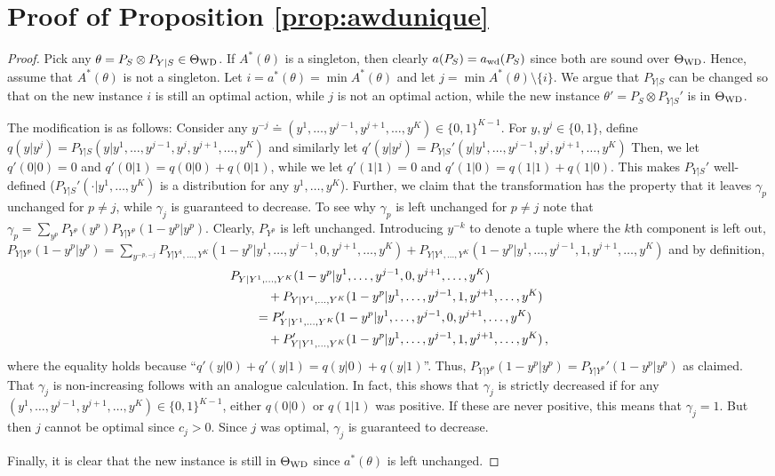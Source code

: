 \section*{Proof of Proposition \ref{prop:awdunique}}
\begin{proof}
	Pick any $\theta = P_S\otimes P_{Y|S}\in \Theta_{\mathrm{WD}}$. If $A^*(\theta)$ is a singleton, then clearly $a(P_S) = a_{\mathrm{wd}}(P_S)$ since both are sound over $\Theta_{\mathrm{WD}}$.
	Hence, assume that $A^*(\theta)$ is not a singleton.
	Let $i = a^*(\theta) = \min A^*(\theta)$ and let $j = \min A^*(\theta) \setminus \{ i \}$.
	We argue that $P_{Y|S}$ can be changed so that on the new instance $i$ is still an optimal action, while
	$j$ is not an optimal action, while the new instance $\theta' = P_S \otimes P_{Y|S}'$ is in $\Theta_{\mathrm{WD}}$.
	
	The modification is as follows:
	Consider any $y^{-j} \doteq (y^1,\dots,y^{j-1},y^{j+1},\dots,y^K)\in \{0,1\}^{K-1}$.
	For $y,y^j\in \{0,1\}$, define 
	$q(y|y^j) = P_{Y|S}(y|y^1, \dots, y^{j-1}, y^j, y^{j+1},\dots, y^K)$
	and similarly let
	$q'(y|y^j) = P_{Y|S}'(y|y^1, \dots, y^{j-1}, y^j, y^{j+1},\dots, y^K)$
	Then, we let $q'(0|0) = 0$ and $q'(0|1) = q(0|0) + q(0|1)$,
	while we let  $q'(1|1) = 0$ and $q'(1|0) = q(1|1) + q(1|0)$.
	This makes $P_{Y|S}'$ well-defined ($P_{Y|S}'(\cdot|y^1,\dots,y^K)$ is a distribution for any $y^1,\dots,y^K$).
	Further, we claim that the transformation has the property that 
	it leaves $\gamma_p$ unchanged for $p\ne j$, while $\gamma_j$ is guaranteed to decrease.
	To see why $\gamma_p$ is left unchanged for $p\ne j$ note that
	$\gamma_p = \sum_{y^p}  P_{Y^p}(y^p) P_{Y|Y^p}(1-y^p|y^p)$.
	Clearly, $P_{Y^p}$ is left unchanged.
	Introducing $y^{-k}$ to denote a tuple where the $k$th component is left out,
	$P_{Y|Y^p}(1-y^p|y^p) = \sum_{y^{-p,-j}} P_{Y|Y^1,\dots,Y^K}( 1-y^p | y^1,\dots, y^{j-1}, 0, y^{j+1}, \dots, y^K )
	+P_{Y|Y^1,\dots,Y^K}( 1-y^p | y^1,\dots, y^{j-1}, 1, y^{j+1}, \dots, y^K )$
	and by definition,
	\begin{align*}
	\MoveEqLeft P_{Y|Y^1,\dots,Y^K}( 1-y^p | y^1,\dots, y^{j-1}, 0, y^{j+1}, \dots, y^K )\\
	&\quad +P_{Y|Y^1,\dots,Y^K}( 1-y^p | y^1,\dots, y^{j-1}, 1, y^{j+1}, \dots, y^K )\\
	&
	=
	P_{Y|Y^1,\dots,Y^K}'( 1-y^p | y^1,\dots, y^{j-1}, 0, y^{j+1}, \dots, y^K )\\
	&\quad+P_{Y|Y^1,\dots,Y^K}'( 1-y^p | y^1,\dots, y^{j-1}, 1, y^{j+1}, \dots, y^K )\,,
	\end{align*}
	where the equality holds because ``$q'(y|0)+q'(y|1) = q(y|0) + q(y|1)$''.
	Thus, $P_{Y|Y^p}(1-y^p|y^p) = P_{Y|Y^p}'(1-y^p|y^p)$ as claimed.
	That $\gamma_j$ is non-increasing follows with an analogue calculation.
	In fact, this shows that $\gamma_j$ is strictly decreased
	if for any $(y^1,\dots,y^{j-1},y^{j+1},\dots,y^K)\in \{0,1\}^{K-1}$, either $q(0|0)$ or $q(1|1)$ was positive.
	If these are never positive, this means that $\gamma_j=1$. 
	But then $j$ cannot be optimal since $c_j>0$.
	Since $j$ was optimal, $\gamma_j$ is guaranteed to decrease.
	
	Finally, it is clear that the new instance is still in $\Theta_{\mathrm{WD}}$ since  $a^*(\theta)$ is left unchanged.
	\end{proof}

